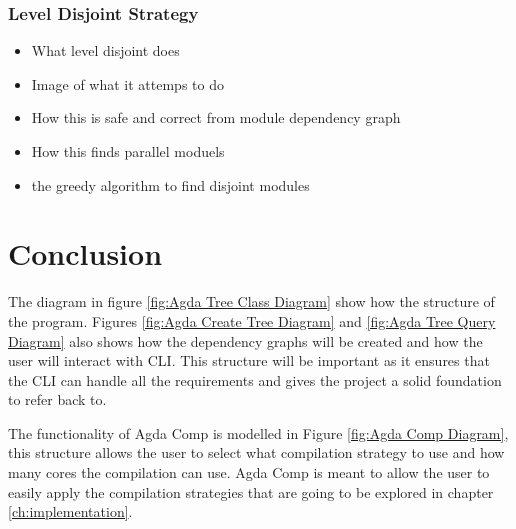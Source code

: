 \subsubsection{Level Disjoint Strategy}

\begin{itemize}
\item What level disjoint does
\item Image of what it attemps to do
\item How this is safe and correct from module dependency graph 
\item How this finds parallel moduels 
\item the greedy algorithm to find disjoint modules
\end{itemize}


\pagebreak

\section{Conclusion}

The diagram in figure \ref{fig:Agda Tree Class Diagram} show how the structure
of the program. Figures \ref{fig:Agda Create Tree Diagram} and \ref{fig:Agda
Tree Query Diagram} also shows how the dependency graphs will be created and
how the user will interact with CLI. This structure will be important as it
ensures that the CLI can handle all the requirements and gives the project a
solid foundation to refer back to. 

The functionality of Agda Comp is modelled in Figure \ref{fig:Agda Comp
Diagram}, this structure allows the user to select what compilation strategy to
use and how many cores the compilation can use. Agda Comp is meant to allow the
user to easily apply the compilation strategies that are going to be explored
in chapter \ref{ch:implementation}.

%
